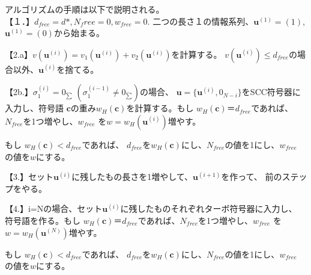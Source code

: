 \documentclass[20 pts]{article}
\begin{document}
アルゴリズムの手順は以下で説明される。\\
【１．】$d_{free}=d*, N_free =0,w_{free}=0$.
二つの長さ１の情報系列、$\mathbf{u}^{(1)}=(1)$,$\mathbf{u}^{(1)}=(0)$から始まる。

【2.a】$\mathit{v(\mathbf{u}^{(i)})}=\mathit{v_1(\mathbf{u}^{(i)})}+
\mathit{v_2(\mathbf{u}^{(i)})}$を計算する。
$\mathit{v}(\mathbf{u}^{(i)}) \leq d_{free}$の場合以外、$\mathbf{u}^{(i)}$を捨てる。

【2b.】$\sigma_1^{(i)}=0_{\sum}\,\,(\sigma_1^{(i-1)}\neq 0_{\sum})$の場合、
$\mathbf{u}=\{ \mathbf{u}^{(i)},0_{N-i}\}$をSCC符号器に入力し、符号語
$\mathbf{c}$の重み$\mathit{w}_H(\mathbf{c})$を計算する。もし
$\mathit{w}_H(\mathbf{c})＝d_{free}$であれば、$N_{free}$を1つ増やし、$w_{free}$
を$w=\mathit{w}_H(\mathbf{u}^{(i)})$増やす。

もし
$\mathit{w}_H(\mathbf{c})<d_{free}$であれば、
$d_{free}$を$\mathit{w}_H(\mathbf{c})$にし、$N_{free}$の値を1にし、$w_{free}$
の値を$w$にする。

【3.】セット$\mathbf{u}^{(i)}$に残したもの長さを1増やして、$\mathbf{u}^{(i+1)}$を作って、
前のステップをやる。

【4.】i=Nの場合、セット$\mathbf{u}^{(i)}$に残したものそれぞれターボ符号器に入力し、
符号語を作る。もし
$\mathit{w}_H(\mathbf{c})＝d_{free}$であれば、$N_{free}$を1つ増やし、$w_{free}$
を$w=\mathit{w}_H(\mathbf{u}^{(N)})$増やす。

もし
$\mathit{w}_H(\mathbf{c})<d_{free}$であれば、
$d_{free}$を$\mathit{w}_H(\mathbf{c})$にし、$N_{free}$の値を1にし、$w_{free}$
の値を$w$にする。
\end{document}
